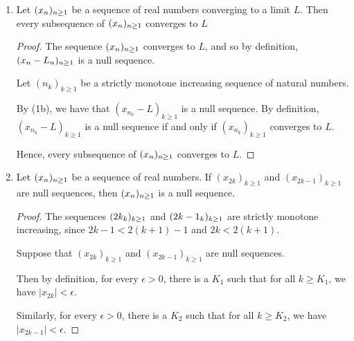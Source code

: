 \documentclass[12pt, letterpaper]{article}
\begin{document}
\begin{enumerate}[label=\bfseries1\alph*)]
\begin{proof}
	Because $\seq{n}{k}$ is strictly monotone increasing, by (1a) we have that 
	$k \leq n_k$ for every $k$. Then for every $k \geq N$, we have $N \leq k \leq n_k$.

	Then for every $k \geq N$, we have $|x_{n_k}| < \epsilon$, i.e. 
	$(x_{n_k})_{k \geq 1}$ is a null sequence.

	Hence, every subsequence of a null sequence is a null sequence.
\end{proof}

\item Let $(x_n)_{n \geq 1}$ be a sequence of real numbers converging to a limit
$L$. Then every subsequence of $(x_n)_{n \geq 1}$ converges to $L$

\begin{proof}
	The sequence $(x_n)_{n \geq 1}$ converges to $L$, and so by definition, $(x_n -L_n)_{n \geq 1}$
	is a null sequence. 

	Let $(n_k)_{k \geq 1}$ be a strictly monotone increasing sequence of natural 
	numbers.

	By (1b), we have that $(x_{n_k}-L)_{k \geq 1}$ is a null sequence. By definition, 
	$(x_{n_k}-L)_{k \geq 1}$ is a null sequence if and only if $(x_{n_k})_{k \geq 1}$
	converges to $L$.

	Hence, every subsequence of $(x_n)_{n \geq 1}$ converges to $L$.
\end{proof}

\item Let $(x_n)_{n \geq 1}$ be a sequence of real numbers. If $(x_{2k})_{k\geq1}$ and
$(x_{2k-1})_{k\geq1}$ are null sequences, then $(x_n)_{n \geq 1}$ is a null sequence.

\begin{proof}
	The sequences $(2k_k)_{k \geq 1}$ and $(2k-1_k)_{k \geq 1}$ are strictly monotone increasing, 
	since $2k-1 < 2(k+1) -1$ and $2k < 2(k+1)$.

	Suppose that $(x_{2k})_{k\geq1}$ and $(x_{2k-1})_{k\geq1}$ are null sequences.
	
	Then by definition, for every $\epsilon > 0$, there is a $K_1$ such that
	for all $k \geq K_1$, we have $|x_{2k}| < \epsilon$.

	Similarly, for every $\epsilon > 0$, there is a $K_2$ such that
	for all $k \geq K_2$, we have $|x_{2k-1}| < \epsilon$.


\end{proof}
\end{enumerate}
\end{document}
